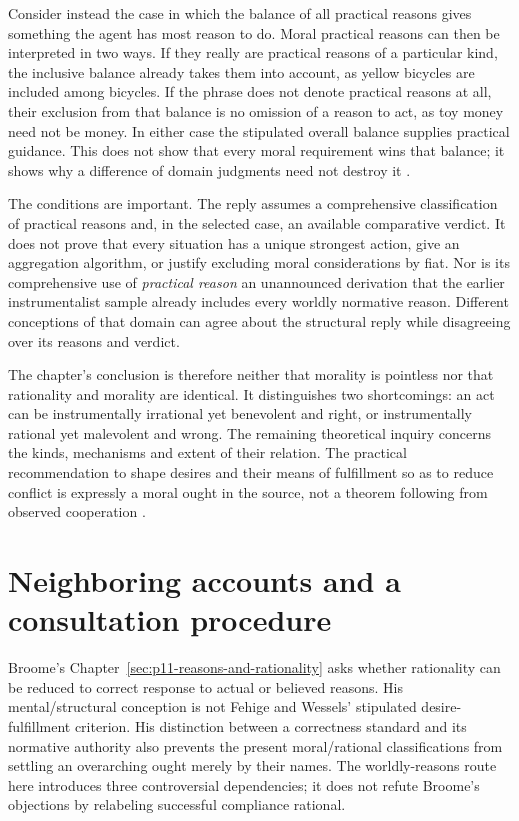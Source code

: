 Consider instead the case in which the balance of all practical
reasons gives something the agent has most reason to do. Moral
practical reasons can then be interpreted in two ways. If they
really are practical reasons of a particular kind, the inclusive
balance already takes them into account, as yellow bicycles are
included among bicycles. If the phrase does not denote practical
reasons at all, their exclusion from that balance is no omission
of a reason to act, as toy money need not be money. In either
case the stipulated overall balance supplies practical guidance.
This does not show that every moral requirement wins that balance;
it shows why a difference of domain judgments need not destroy it
\parencite[pp.~688--689]{FehigeWessels2021Morality}.

The conditions are important. The reply assumes a comprehensive
classification of practical reasons and, in the selected case,
an available comparative verdict. It does not prove that every
situation has a unique strongest action, give an aggregation
algorithm, or justify excluding moral considerations by fiat.
Nor is its comprehensive use of \emph{practical reason} an
unannounced derivation that the earlier instrumentalist sample
already includes every worldly normative reason. Different
conceptions of that domain can agree about the structural reply
while disagreeing over its reasons and verdict.

The chapter's conclusion is therefore neither that morality is
pointless nor that rationality and morality are identical. It
distinguishes two shortcomings: an act can be instrumentally
irrational yet benevolent and right, or instrumentally rational
yet malevolent and wrong. The remaining theoretical inquiry
concerns the kinds, mechanisms and extent of their relation.
The practical recommendation to shape desires and their means
of fulfillment so as to reduce conflict is expressly a moral
ought in the source, not a theorem following from observed
cooperation \parencite[p.~689]{FehigeWessels2021Morality}.

\section{Neighboring accounts and a consultation procedure}
\label{sec:p11-rat121-consultation}

Broome's Chapter~\ref{sec:p11-reasons-and-rationality} asks whether
rationality can be reduced to correct response to actual or believed
reasons. His mental/structural conception is not Fehige and Wessels'
stipulated desire-fulfillment criterion. His distinction between
a correctness standard and its normative authority also prevents
the present moral/rational classifications from settling an
overarching ought merely by their names. The worldly-reasons route
here introduces three controversial dependencies; it does not
refute Broome's objections by relabeling successful compliance rational.

